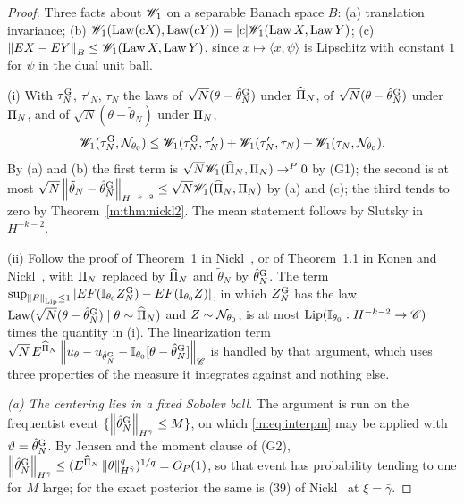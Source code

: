 \begin{proof}
Three facts about $\mathscr{W}_1$ on a separable Banach space $B$: (a) translation invariance; (b) $\mathscr{W}_1(\operatorname{Law}(cX),\operatorname{Law}(cY))=|c|\mathscr{W}_1(\operatorname{Law} X,\operatorname{Law} Y)$; (c) $\left\|EX-EY\right\|_B\le\mathscr{W}_1(\operatorname{Law} X,\operatorname{Law} Y)$, since $x\mapsto\langle x,\psi\rangle$ is Lipschitz with constant $1$ for $\psi$ in the dual unit ball.

(i) With $\tau^{\rm G}_N$, $\tau'_N$, $\tau_N$ the laws of $\sqrt N(\theta-\hat\theta^{\rm G}_N)$ under $\widehat\Pi_N$, of $\sqrt N(\theta-\hat\theta^{\rm G}_N)$ under $\Pi_N$, and of $\sqrt N(\theta-\tilde\theta_N)$ under $\Pi_N$,
\[
\mathscr{W}_1(\tau_N^{\rm G},\mathcal{N}_{\theta_0})\le\mathscr{W}_1(\tau_N^{\rm G},\tau_N')+\mathscr{W}_1(\tau_N',\tau_N)+\mathscr{W}_1(\tau_N,\mathcal{N}_{\theta_0}).
\]
By (a) and (b) the first term is $\sqrt N\mathscr{W}_1(\widehat\Pi_N,\Pi_N)\to^P0$ by (G1); the second is at most $\sqrt N\left\|\tilde\theta_N-\hat\theta^{\rm G}_N\right\|_{H^{-k-2}}\le\sqrt N\mathscr{W}_1(\widehat\Pi_N,\Pi_N)$ by (a) and (c); the third tends to zero by Theorem~\ref{m:thm:nickl2}. The mean statement follows by Slutsky in $H^{-k-2}$.

(ii) Follow the proof of Theorem~1 in Nickl~\cite{nicklbvm2024}, or of Theorem~1.1 in Konen and Nickl~\cite{konennickl2026}, with $\Pi_N$ replaced by $\widehat\Pi_N$ and $\tilde\theta_N$ by $\hat\theta^{\rm G}_N$. The term $\sup_{\left\|F\right\|_{\operatorname{Lip}}\le1}|EF(\mathbb{I}_{\theta_0}Z^{\rm G}_N)-EF(\mathbb{I}_{\theta_0}Z)|$, in which $Z^{\rm G}_N$ has the law $\operatorname{Law}(\sqrt N(\theta-\hat\theta^{\rm G}_N)\mid\theta\sim\widehat\Pi_N)$ and $Z\sim\mathcal{N}_{\theta_0}$, is at most $\operatorname{Lip}(\mathbb{I}_{\theta_0}:H^{-k-2}\to\mathscr{C})$ times the quantity in (i). The linearization term $\sqrt N\,E^{\widehat\Pi_N}\left\|u_\theta-u_{\hat\theta^{\rm G}_N}-\mathbb{I}_{\theta_0}[\theta-\hat\theta^{\rm G}_N]\right\|_{\mathscr{C}}$ is handled by that argument, which uses three properties of the measure it integrates against and nothing else.

\emph{(a) The centering lies in a fixed Sobolev ball.} The argument is run on the frequentist event $\{\left\|\hat\theta^{\rm G}_N\right\|_{H^{\bar\gamma}}\le M\}$, on which \eqref{m:eq:interpm} may be applied with $\vartheta=\hat\theta^{\rm G}_N$. By Jensen and the moment clause of (G2), $\left\|\hat\theta^{\rm G}_N\right\|_{H^{\bar\gamma}}\le(E^{\widehat\Pi_N}\left\|\theta\right\|^q_{H^{\bar\gamma}})^{1/q}=O_P(1)$, so that event has probability tending to one for $M$ large; for the exact posterior the same is (39) of Nickl~\cite{nicklbvm2024} at $\xi=\bar\gamma$.


\end{proof}
